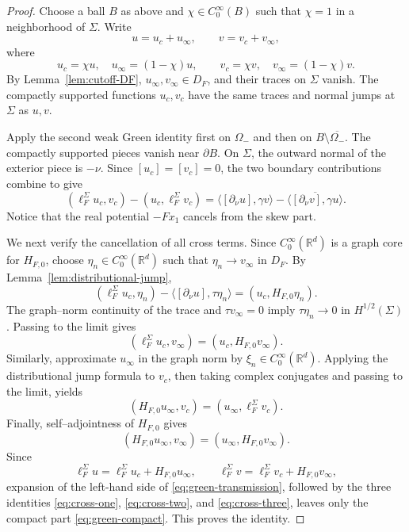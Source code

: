 \documentclass[a4paper,11pt]{article}
\numberwithin{equation}{section}
\theoremstyle{remark}
\theoremstyle{definition}
\theoremstyle{remark}
\begin{document}
\begin{proof}
Choose a ball $B$ as above and $\chi\in C_0^\infty(B)$ such that $\chi=1$ in a neighborhood of $\Sigma$.
Write
$$
u=u_c+u_\infty,\qquad v=v_c+v_\infty,
$$
where
$$
u_c=\chi u,\quad u_\infty=(1-\chi)u,
\qquad
v_c=\chi v,\quad v_\infty=(1-\chi)v.
$$
By Lemma~\ref{lem:cutoff-DF}, $u_\infty,v_\infty\in D_F$, and their traces on $\Sigma$ vanish.
The compactly supported functions $u_c,v_c$ have the same traces and normal jumps at $\Sigma$ as $u,v$.

Apply the second weak Green identity first on $\Omega_-$ and then on $B\setminus\overline{\Omega_-}$.
The compactly supported pieces vanish near $\partial B$.
On $\Sigma$, the outward normal of the exterior piece is $-\nu$.
Since $[u_c]=[v_c]=0$, the two boundary contributions combine to give
\begin{equation}\label{eq:green-compact}
(\ell_F^\Sigma u_c,v_c)
-(u_c,\ell_F^\Sigma v_c)
=
\langle[\partial_\nu u],\gamma v\rangle
-\overline{\langle[\partial_\nu v],\gamma u\rangle}.
\end{equation}
Notice that the real potential $-Fx_1$ cancels from the skew part.

We next verify the cancellation of all cross terms.
Since $C_0^\infty(\mathbb R^d)$ is a graph core for $H_{F,0}$, choose $\eta_n\in C_0^\infty(\mathbb R^d)$ such that $\eta_n\to v_\infty$ in $D_F$.
By Lemma~\ref{lem:distributional-jump},
$$
(\ell_F^\Sigma u_c,\eta_n)
-\langle[\partial_\nu u],\tau\eta_n\rangle
=(u_c,H_{F,0}\eta_n).
$$
The graph--norm continuity of the trace and $\tau v_\infty=0$ imply $\tau\eta_n\to0$ in $H^{1/2}(\Sigma)$.
Passing to the limit gives
\begin{equation}\label{eq:cross-one}
(\ell_F^\Sigma u_c,v_\infty)
=(u_c,H_{F,0}v_\infty).
\end{equation}
Similarly, approximate $u_\infty$ in the graph norm by $\xi_n\in C_0^\infty(\mathbb R^d)$.
Applying the distributional jump formula to $v_c$, then taking complex conjugates and passing to the limit, yields
\begin{equation}\label{eq:cross-two}
(H_{F,0}u_\infty,v_c)
=(u_\infty,\ell_F^\Sigma v_c).
\end{equation}
Finally, self--adjointness of $H_{F,0}$ gives
\begin{equation}\label{eq:cross-three}
(H_{F,0}u_\infty,v_\infty)
=(u_\infty,H_{F,0}v_\infty).
\end{equation}
Since
$$
\ell_F^\Sigma u=\ell_F^\Sigma u_c+H_{F,0}u_\infty,
\qquad
\ell_F^\Sigma v=\ell_F^\Sigma v_c+H_{F,0}v_\infty,
$$
expansion of the left-hand side of \eqref{eq:green-transmission}, followed by the three identities \eqref{eq:cross-one}, \eqref{eq:cross-two}, and \eqref{eq:cross-three}, leaves only the compact part \eqref{eq:green-compact}.
This proves the identity.
\end{proof}
\end{document}
